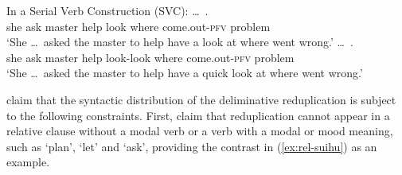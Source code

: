 \begin{sloppypar}
\ex\label{ex:syn-svc} In a Serial Verb Construction (SVC):
		\ea \gll {} \ldots\,       .\\
		she {}  ask master help look where come.out-\textsc{pfv} problem\\
		\glt `She \ldots\, asked the master to help have a look at where went wrong.'
		\ex \gll {} \ldots\,       .\\
		she {} ask master help look-look where come.out-\textsc{pfv} problem\\ 
		\glt `She \ldots\, asked the master to help have a quick look at where went wrong.'
		\z
\z

\end{sloppypar}

\citet{SuiHu2016} claim that the syntactic distribution of the deliminative reduplication is subject to the following constraints.
First, \citet[319, 332]{SuiHu2016} claim that reduplication
 cannot appear in a relative clause without a modal verb 
 or a verb with a modal or mood meaning, 
 such as  `plan',  `let' and  `ask', 
 providing the contrast in (\ref{ex:rel-suihu}) as an example.
\ea\label{ex:rel-suihu}


